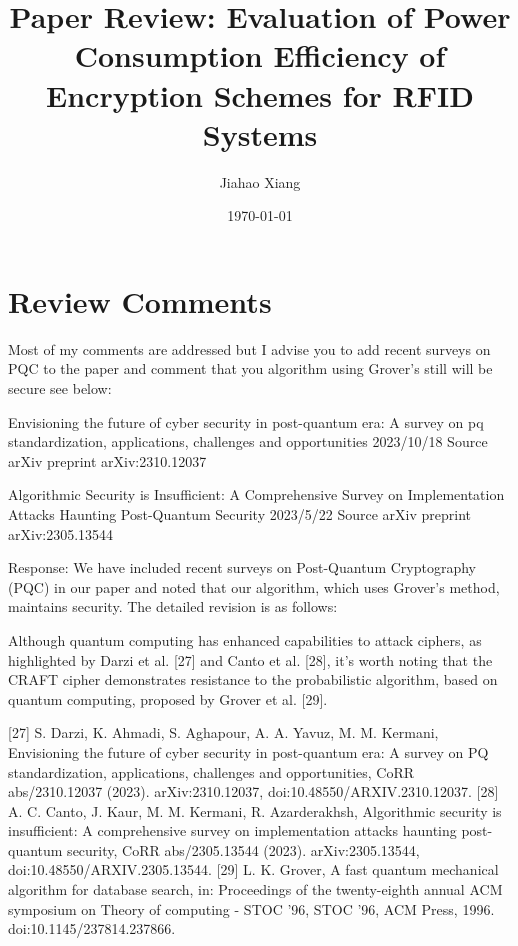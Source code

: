 \documentclass{article}
\title{Paper Review: Evaluation of Power Consumption Efficiency of Encryption Schemes for RFID Systems}
\author{Jiahao Xiang}
\date{\today}
\begin{document}
\maketitle

\section{Review Comments}
Most of my comments are addressed but I advise you to add recent surveys on PQC to the paper and comment that you algorithm using Grover's still will be secure see below:


Envisioning the future of cyber security in post-quantum era: A survey on pq standardization, applications, challenges and opportunities
2023/10/18
Source
arXiv preprint arXiv:2310.12037

Algorithmic Security is Insufficient: A Comprehensive Survey on Implementation Attacks Haunting Post-Quantum Security
2023/5/22
Source
arXiv preprint arXiv:2305.13544

Response: We have included recent surveys on Post-Quantum Cryptography (PQC) in our paper and noted that our algorithm, which uses Grover's method, maintains security. The detailed revision is as follows:

Although quantum computing has enhanced capabilities to attack ciphers, as highlighted by Darzi et al. [27] and Canto et al. [28], it's worth noting that the CRAFT cipher demonstrates resistance to the probabilistic algorithm, based on quantum computing, proposed by Grover et al. [29].

[27] S. Darzi, K. Ahmadi, S. Aghapour, A. A. Yavuz, M. M. Kermani, Envisioning the future of cyber security in post-quantum era: A survey on PQ standardization, applications, challenges and opportunities, CoRR abs/2310.12037 (2023). arXiv:2310.12037, doi:10.48550/ARXIV.2310.12037.
[28] A. C. Canto, J. Kaur, M. M. Kermani, R. Azarderakhsh, Algorithmic security is insufficient: A comprehensive survey on implementation attacks haunting post-quantum security, CoRR abs/2305.13544 (2023). arXiv:2305.13544, doi:10.48550/ARXIV.2305.13544.
[29] L. K. Grover, A fast quantum mechanical algorithm for database search, in: Proceedings of the twenty-eighth annual ACM symposium on Theory of computing - STOC '96, STOC '96, ACM Press, 1996. doi:10.1145/237814.237866.

\end{document}
